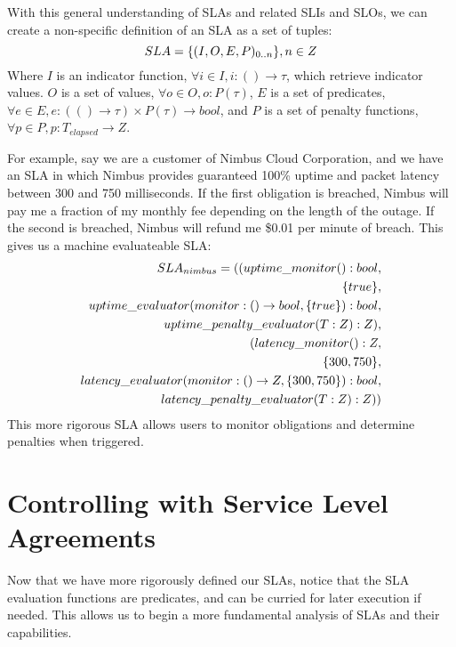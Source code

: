 With this general understanding of SLAs and related SLIs and SLOs, we can create a non-specific definition of an SLA as a set of tuples:
\begin{equation}
SLA = \lbrace (I,O,E,P)_{0..n} \rbrace, n \in Z \\
\end{equation}
Where $ I $ is an indicator function, $ \forall i \in I, i : () \rightarrow \tau $, which retrieve indicator values.  $ O $ is a set of values, $ \forall o \in O, o : P(\tau) $, $ E $ is a set of predicates, $ \forall e \in E, e : ( () \rightarrow \tau ) \times P(\tau) \rightarrow bool $, and $ P $ is a set of penalty functions, $ \forall p \in P, p : T_{elapsed} \rightarrow Z $.

For example, say we are a customer of Nimbus Cloud Corporation, and we have an SLA in which Nimbus provides guaranteed 100\% uptime and packet latency between 300 and 750 milliseconds.  If the first obligation is breached, Nimbus will pay me a fraction of my monthly fee depending on the length of the outage.  If the second is breached, Nimbus will refund me \$0.01 per minute of breach.  This gives us a machine evaluateable SLA:
\begin{align}
SLA_{nimbus} = ( ( uptime\_monitor() : bool, \\
\lbrace true \rbrace, \notag \\
uptime\_evaluator( monitor : () \rightarrow bool, \lbrace true \rbrace) : bool, \notag \\
uptime\_penalty\_evaluator( T : Z ) : Z ), \notag \\
( latency\_monitor() : Z, \notag \\
\lbrace 300, 750 \rbrace, \notag \\
latency\_evaluator( monitor : () \rightarrow Z, \lbrace 300, 750 \rbrace) : bool, \notag \\
latency\_penalty\_evaluator( T : Z ) : Z) ) \notag
\end{align}
This more rigorous SLA allows users to monitor obligations and determine penalties when triggered.

\section{Controlling with Service Level Agreements}\label{sec:SLA-analysis}
Now that we have more rigorously defined our SLAs, notice that the SLA evaluation functions are predicates, and can be curried for later execution if needed.  This allows us to begin a more fundamental analysis of SLAs and their capabilities.

